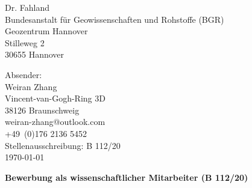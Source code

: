 \label{sec:Anschreiben}
\begin{minipage}[t][2cm][t]{0.6\linewidth}
	\normalfont
Dr. Fahland \\[0.5em]
Bundesanstalt für Geowissenschaften und Rohstoffe (BGR)\\
Geozentrum Hannover\\
Stilleweg 2\\
30655 Hannover\\
	\vfill
\end{minipage}
\hfill
\begin{minipage}[t][4.5cm][t]{0.3\linewidth}
	\raggedleft
	\small{ \color{darkgray}
		Absender:\\\vspace{0.5em}Weiran Zhang\\ \vspace{0.5em}
		Vincent-van-Gogh-Ring 3D\\ 38126 Braunschweig\\\vspace{0.5em}
		weiran-zhang@outlook.com\\
		+49~(0)176 2136 5452\\}
	\vspace{0.5em}
Stellenausschreibung: B 112/20\\[0.5em]
 \today
	\vfill	
\end{minipage}
\begin{minipage}[t][1cm][t]{1\linewidth}
	\large\textbf{Bewerbung als wissenschaftlicher Mitarbeiter (B 112/20)\\[1em]}
\end{minipage}

